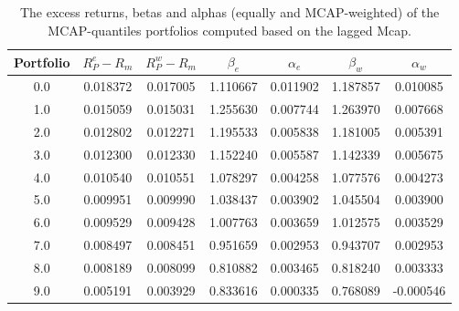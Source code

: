 \documentclass[10pt]{article}
\newenvironment{exercise}[2][Exercise]{\begin{trivlist}
  \item[\hskip \labelsep {\bfseries #1}\hskip \labelsep {\bfseries #2.}]}{\end{trivlist}}
\begin{document}
\begin{exercise}{2}
\begin{table}
\centering
\begin{tabular}{|c|cccccc|}
\toprule
Portfolio &  $R^{e}_{P} - R_m$&  $R^{w}_{P} - R_m$ &    $\beta_e$ &   $\alpha_e$ &    $\beta_w$ &  $\alpha_w$ \\
\midrule
0.0             &  0.018372 &  0.017005 &  1.110667 &  0.011902 &  1.187857 &  0.010085 \\
1.0             &  0.015059 &  0.015031 &  1.255630 &  0.007744 &  1.263970 &  0.007668 \\
2.0             &  0.012802 &  0.012271 &  1.195533 &  0.005838 &  1.181005 &  0.005391 \\
3.0             &  0.012300 &  0.012330 &  1.152240 &  0.005587 &  1.142339 &  0.005675 \\
4.0             &  0.010540 &  0.010551 &  1.078297 &  0.004258 &  1.077576 &  0.004273 \\
5.0             &  0.009951 &  0.009990 &  1.038437 &  0.003902 &  1.045504 &  0.003900 \\
6.0             &  0.009529 &  0.009428 &  1.007763 &  0.003659 &  1.012575 &  0.003529 \\
7.0             &  0.008497 &  0.008451 &  0.951659 &  0.002953 &  0.943707 &  0.002953 \\
8.0             &  0.008189 &  0.008099 &  0.810882 &  0.003465 &  0.818240 &  0.003333 \\
9.0             &  0.005191 &  0.003929 &  0.833616 &  0.000335 &  0.768089 & -0.000546 \\
\bottomrule
\end{tabular}
\caption{The excess returns, betas and alphas (equally and MCAP-weighted) of the MCAP-quantiles portfolios
  computed based on the lagged Mcap.}
\label{tbl:lagged}
\end{table}

\end{exercise}
  
\end{document}
